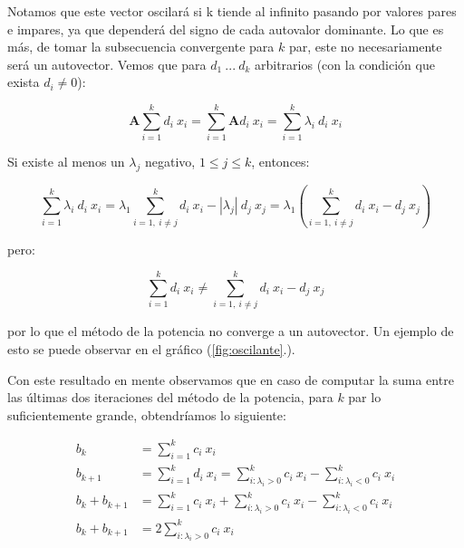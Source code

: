 \vspace{1em}
\noindent Notamos que este vector oscilará si k tiende al infinito pasando por valores pares e impares, ya que dependerá del signo de cada autovalor dominante. Lo que es más, de tomar la subsecuencia convergente para $k$ par, este no necesariamente será un autovector. Vemos que para $d_1\ ...\ d_k$ arbitrarios (con la condición que exista $d_i \neq 0$):

\begin{equation*}
    \mathbf{A} \sum_{i=1}^{k} d_i\ x_i = \sum_{i=1}^{k} \mathbf{A} d_i\ x_i = \sum_{i=1}^{k} \lambda_i\ d_i\ x_i 
\end{equation*}

\vspace{2em} 
\noindent Si existe al menos un $\lambda_j$ negativo, $1 \leq j \leq k$, entonces:

\begin{equation*}
    \sum_{i=1}^{k} \lambda_i\ d_i\ x_i = \lambda_1 \sum_{i = 1,\ i \neq j}^{k} d_i\ x_i - |\lambda_j|\ d_j\ x_j = \lambda_1 (\sum_{i = 1,\ i \neq j}^{k} d_i\ x_i - d_j\ x_j)
\end{equation*}

\vspace{1em} 
\noindent pero:

\begin{equation*}
    \sum_{i=1}^{k} d_i\ x_i \neq \sum_{i = 1,\ i \neq j}^{k} d_i\ x_i - d_j\ x_j
\end{equation*}

\vspace{1em}
\noindent por lo que el método de la potencia no converge a un autovector. 
Un ejemplo de esto se puede observar en el gráfico (\ref{fig:oscilante}.).

\vspace{1em}
Con este resultado en mente observamos que en caso de computar la suma entre las últimas dos iteraciones del método de la potencia, para $k$ par lo suficientemente grande, obtendríamos lo siguiente:

\vspace{1em}
\begin{align*}
    b_k &= \sum_{i=1}^{k} c_i\ x_i \\
    b_{k+1} &= \sum_{i=1}^{k} d_i\ x_i = \sum_{i: \lambda_i > 0}^{k} c_i\ x_i - \sum_{i: \lambda_i < 0}^{k} c_i\ x_i \\ 
    b_k + b_{k+1} &= \sum_{i=1}^{k} c_i\ x_i + \sum_{i: \lambda_i > 0}^{k} c_i\ x_i - \sum_{i: \lambda_i < 0}^{k} c_i\ x_i   \\ 
    b_k + b_{k+1} &= 2 \sum_{i: \lambda_i > 0}^{k} c_i\ x_i
\end{align*}

